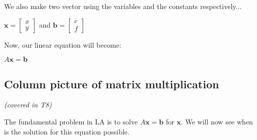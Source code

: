 \documentclass[a4paper]{article}
\begin{document}
We also make two vector using the variables and the constants respectively...
\begin{center}
    $\textbf{x} = \begin{bmatrix}
        x \\
        y 
    \end{bmatrix}$ \hspace{5px} 
    and \hspace{5px}
$\textbf{b} = \begin{bmatrix}
        c \\
        f 
    \end{bmatrix}$ 
\end{center}

Now, our linear equation will become:
\begin{center}
    $A\textbf{x} = \textbf{b}$
\end{center}

\subsection{Column picture of matrix multiplication}
\textit{(covered in T8)}

The fundamental problem in LA is to solve $A\textbf{x} = \textbf{b}$ for $\textbf{x}$. We will now see when is the solution for this equation possible.
\end{document}
